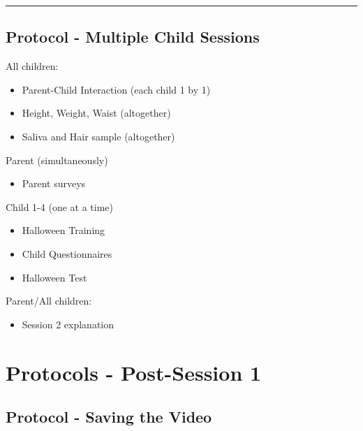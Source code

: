 \documentclass[]{book}
\providecommand{\tightlist}{%
  \setlength{\itemsep}{0pt}\setlength{\parskip}{0pt}}
\begin{document}
\begin{center}\rule{0.5\linewidth}{0.5pt}\end{center}

\hypertarget{protocol---multiple-child-sessions-1}{%
\subsection{Protocol - Multiple Child Sessions}\label{protocol---multiple-child-sessions-1}}

All children:

\begin{itemize}
\item
  Parent-Child Interaction (each child 1 by 1)
\item
  Height, Weight, Waist (altogether)
\item
  Saliva and Hair sample (altogether)
\end{itemize}

Parent (simultaneously)

\begin{itemize}
\tightlist
\item
  Parent surveys
\end{itemize}

Child 1-4 (one at a time)

\begin{itemize}
\item
  Halloween Training
\item
  Child Questionnaires
\item
  Halloween Test
\end{itemize}

Parent/All children:

\begin{itemize}
\tightlist
\item
  Session 2 explanation
\end{itemize}

\hypertarget{protocols---post-session-1-1}{%
\section{Protocols - Post-Session 1}\label{protocols---post-session-1-1}}

\hypertarget{protocol---saving-the-video-1}{%
\subsection{Protocol - Saving the Video}\label{protocol---saving-the-video-1}}
\end{document}
